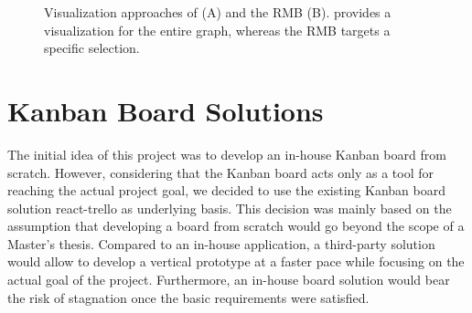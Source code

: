\begin{figure}[ht]
	\centering {}
	\caption[Visualization Approaches of  and the \acrshort*{RMB}]{Visualization approaches of  (A) and the \acrshort*{RMB} (B).  provides a visualization for the entire graph, whereas the \acrshort*{RMB} targets a specific selection.}
	\label{fig:VOWL}
\end{figure}





\section{Kanban Board Solutions}\label{sec:Kanban Board Solutions}


The initial idea of this project was to develop an in-house Kanban board from scratch. However, considering that the Kanban board acts only as a tool for reaching the actual project goal, we decided to use the existing Kanban board solution react-trello as underlying basis. This decision was mainly based on the assumption that developing a board from scratch would go beyond the scope of a Master’s thesis. Compared to an in-house application, a third-party solution would allow to develop a vertical prototype at a faster pace while focusing on the actual goal of the project. Furthermore, an in-house board solution would bear the risk of stagnation once the basic requirements were satisfied. 

